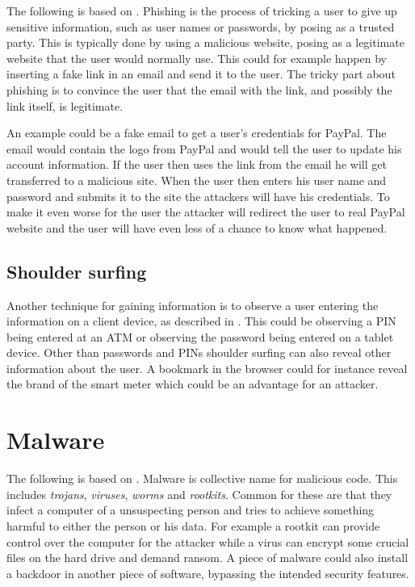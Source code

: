 The following is based on \citet{security_engineering_ross_anderson,dhamija2006phishing}.
Phishing is the process of tricking a user to give up sensitive information, such as user names or passwords, by posing as a trusted party.
This is typically done by using a malicious website, posing as a legitimate website that the user would normally use.
This could for example happen by inserting a fake link in an email and send it to the user.
The tricky part about phishing is to convince the user that the email with the link, and possibly the link itself, is legitimate.

An example could be a fake email to get a user's credentials for PayPal.
The email would contain the logo from PayPal and would tell the user to update his account information.
If the user then uses the link from the email he will get transferred to a malicious site.
When the user then enters his user name and password and submits it to the site the attackers will have his credentials.
To make it even worse for the user the attacker will redirect the user to real PayPal website and the user will have even less of a chance to know what happened.

\subsection{Shoulder surfing}\label{attack:shoulder}
Another technique for gaining information is to observe a user entering the information on a client device, as described in \citet{notechhack}.
This could be observing a PIN being entered at an ATM or observing the password being entered on a tablet device.
Other than passwords and PINs shoulder surfing can also reveal other information about the user.
A bookmark in the browser could for instance reveal the brand of the smart meter which could be an advantage for an attacker.

\section{Malware}\label{attack:malware}
The following is based on \citet[p.~644]{security_engineering_ross_anderson}.
Malware is collective name for malicious code. 
This includes \emph{trojans}, \emph{viruses}, \emph{worms} and \emph{rootkits}.
Common for these are that they infect a computer of a unsuspecting person and tries to achieve something harmful to either the person or his data.
For example a rootkit can provide control over the computer for the attacker while a virus can encrypt some crucial files on the hard drive and demand ransom.
A piece of malware could also install a backdoor in another piece of software, bypassing the intended security features.

